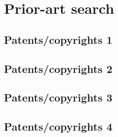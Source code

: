 \chapter{Prior-art search}

\section{Patents/copyrights 1}
\lipsum[1-1]

\section{Patents/copyrights 2}
\lipsum[2-2]

\section{Patents/copyrights 3}
\lipsum[3-3]

\section{Patents/copyrights 4}
\lipsum[1-1]
